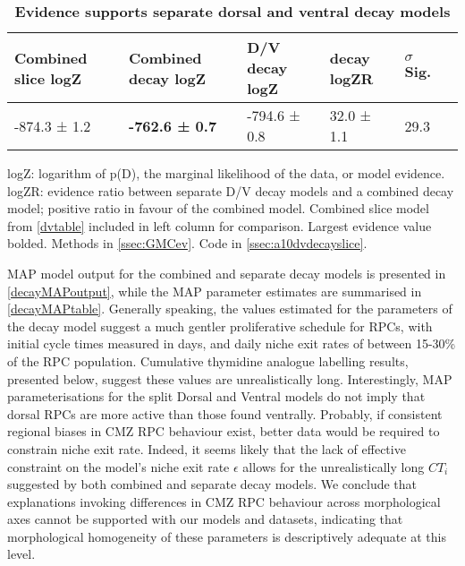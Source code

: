 \begin{table}[!ht]
    \centering
    \caption{{\bf Evidence supports separate dorsal and ventral decay models}}
    \begin{tabular}{|l|l|l|l|l|l|}
        \hline
        {\bf Combined slice logZ} & {\bf Combined decay logZ} & {\bf D/V decay logZ} & {\bf decay logZR} & {\bf $\sigma$ Sig.}\\ \hline
        -874.3 ± 1.2 & {\bf -762.6 ± 0.7} & -794.6 ± 0.8 & 32.0 ± 1.1 & 29.3\\ \hline
    \end{tabular}
    \begin{flushleft} logZ: logarithm of p(D), the marginal likelihood of the data, or model evidence. logZR: evidence ratio between separate D/V decay models and a combined decay model; positive ratio in favour of the combined model. Combined slice model from \autoref{dvtable} included in left column for comparison. Largest evidence value bolded.
    Methods in \autoref{ssec:GMCev}.
    Code in \autoref{ssec:a10dvdecayslice}.     
    \end{flushleft}
    \label{decayevtable}
\end{table}

MAP model output for the combined and separate decay models is presented in \autoref{decayMAPoutput}, while the MAP parameter estimates are summarised in \autoref{decayMAPtable}. Generally speaking, the values estimated for the parameters of the decay model suggest a much gentler proliferative schedule for RPCs, with initial cycle times measured in days, and daily niche exit rates of between 15-30\% of the RPC population. Cumulative thymidine analogue labelling results, presented below, suggest these values are unrealistically long. Interestingly, MAP parameterisations for the split Dorsal and Ventral models do not imply that dorsal RPCs are more active than those found ventrally. Probably, if consistent regional biases in CMZ RPC behaviour exist, better data would be required to constrain niche exit rate. Indeed, it seems likely that the lack of effective constraint on the model's niche exit rate $\epsilon$ allows for the unrealistically long $CT_{i}$ suggested by both combined and separate decay models. We conclude that explanations invoking differences in CMZ RPC behaviour across morphological axes  cannot be supported with our models and datasets, indicating that morphological homogeneity of these parameters is descriptively adequate at this level.

